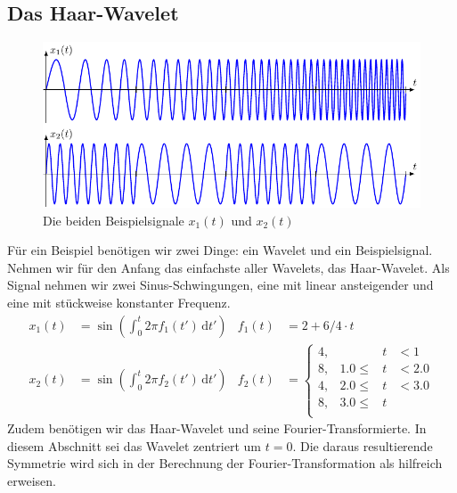 \subsection{Das Haar-Wavelet}
\begin{figure}
	\centering
	\includegraphics[width=\textwidth, keepaspectratio]{papers/complex/images/signals.pdf}
	\caption{Die beiden Beispielsignale $x_1(t)$ und $x_2(t)$}
\end{figure}
Für ein Beispiel benötigen wir zwei Dinge: ein Wavelet und ein Beispielsignal.
Nehmen wir für den Anfang das einfachste aller Wavelets, das Haar-Wavelet.
Als Signal nehmen wir zwei Sinus-Schwingungen, eine mit linear ansteigender und eine mit stückweise konstanter Frequenz.
\begin{align}
    x_1(t) &= \sin\left( \int_{0}^{t} 2\pi f_1(t')\,\mathrm{d}t'\right) & f_1(t) &= 2 + 6/4 \cdot t \\
    x_2(t) &= \sin\left( \int_{0}^{t} 2\pi f_2(t')\,\mathrm{d}t'\right) & f_2(t) &= \left\lbrace \begin{matrix}
    4, & &t& < 1\\
    8, & 1.0 \le &t& < 2.0\\
    4, & 2.0 \le &t& < 3.0\\
    8, & 3.0 \le &t&\\
    \end{matrix}\right.
\end{align}
Zudem benötigen wir das Haar-Wavelet und seine Fourier-Transformierte.
In diesem Abschnitt sei das Wavelet zentriert um $t=0$.
Die daraus resultierende Symmetrie wird sich in der Berechnung der Fourier-Transformation als hilfreich erweisen.

